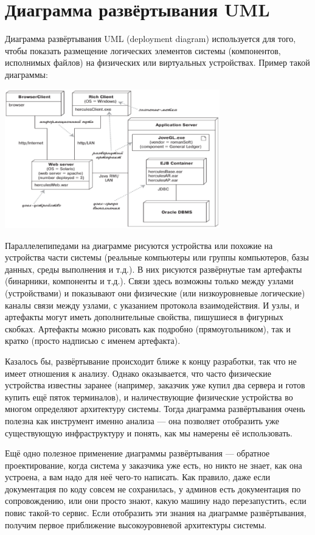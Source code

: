\documentclass{../../text-style}
\begin{document}
\section{Диаграмма развёртывания UML}

Диаграмма развёртывания UML (deployment diagram) используется для того, чтобы показать размещение логических элементов системы (компонентов, исполнимых файлов) на физических или виртуальных устройствах. Пример такой диаграммы:

\begin{center}
    \includegraphics[width=0.7\textwidth]{deploymentDiagram.png}
\end{center}

Параллелепипедами на диаграмме рисуются устройства или похожие на устройства части системы (реальные компьютеры или группы компьютеров, базы данных, среды выполнения и т.д.). В них рисуются развёрнутые там артефакты (бинарники, компоненты и т.д.). Связи здесь возможны только между узлами (устройствами) и показывают они физические (или низкоуровневые логические) каналы связи между узлами, с указанием протокола взаимодействия. И узлы, и артефакты могут иметь дополнительные свойства, пишушиеся в фигурных скобках. Артефакты можно рисовать как подробно (прямоугольником), так и кратко (просто надписью с именем артефакта).

Казалось бы, развёртывание происходит ближе к концу разработки, так что не имеет отношения к анализу. Однако оказывается, что часто физические устройства известны заранее (например, заказчик уже купил два сервера и готов купить ещё пяток терминалов), и наличествующие физические устройства во многом определяют архитектуру системы. Тогда диаграмма развёртывания очень полезна как инструмент именно анализа --- она позволяет отобразить уже существующую инфраструктуру и понять, как мы намерены её использовать.

Ещё одно полезное применение диаграммы развёртывания --- обратное проектирование, когда система у заказчика уже есть, но никто не знает, как она устроена, а вам надо для неё чего-то написать. Как правило, даже если документация по коду совсем не сохранилась, у админов есть документация по сопровождению, или они просто знают, какую машину надо перезапустить, если повис такой-то сервис. Если отобразить эти знания на диаграмме развёртывания, получим первое приближение высокоуровневой архитектуры системы.
\end{document}
